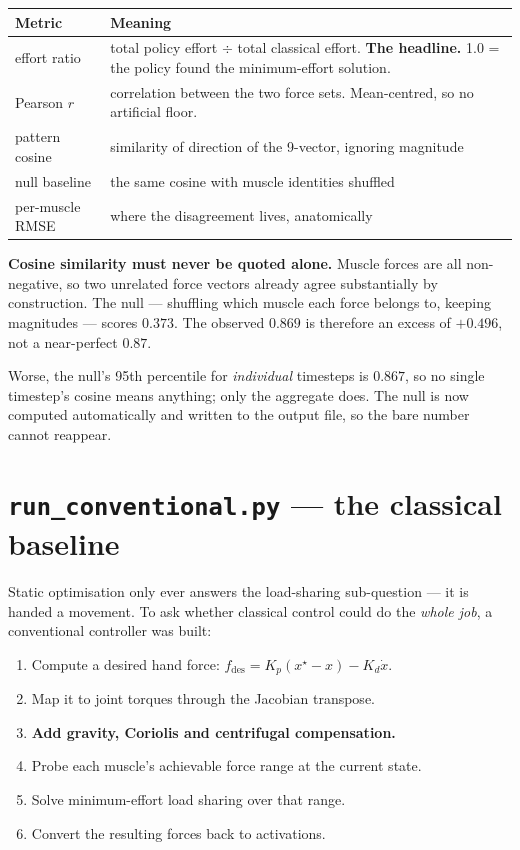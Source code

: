 \begin{center}
\begin{tabular}{@{} L{3.6cm} L{10.4cm} @{}}
\toprule
\textbf{Metric} & \textbf{Meaning} \\
\midrule
effort ratio & total policy effort $\div$ total classical effort. \textbf{The headline.} 1.0 = the policy found the minimum-effort solution. \\
Pearson $r$ & correlation between the two force sets. Mean-centred, so no artificial floor. \\
pattern cosine & similarity of direction of the 9-vector, ignoring magnitude \\
null baseline & the same cosine with muscle identities shuffled \\
per-muscle RMSE & where the disagreement lives, anatomically \\
\bottomrule
\end{tabular}
\end{center}

\begin{trap}
\textbf{Cosine similarity must never be quoted alone.} Muscle forces are all
non-negative, so two unrelated force vectors already agree substantially by
construction. The null --- shuffling which muscle each force belongs to, keeping
magnitudes --- scores $0.373$. The observed $0.869$ is therefore an excess of
$+0.496$, not a near-perfect $0.87$.

Worse, the null's 95th percentile for \emph{individual} timesteps is $0.867$, so
no single timestep's cosine means anything; only the aggregate does. The null is
now computed automatically and written to the output file, so the bare number
cannot reappear.
\end{trap}

\section{\texttt{run\_conventional.py} --- the classical baseline}
\label{sec:conventional}

Static optimisation only ever answers the load-sharing sub-question --- it is
handed a movement. To ask whether classical control could do the \emph{whole
job}, a conventional controller was built:

\begin{enumerate}[leftmargin=1.5em, itemsep=2pt]
\item Compute a desired hand force: $f_{\text{des}} = K_p(x^\star - x) - K_d\dot{x}$.
\item Map it to joint torques through the Jacobian transpose.
\item \textbf{Add gravity, Coriolis and centrifugal compensation.}
\item Probe each muscle's achievable force range at the current state.
\item Solve minimum-effort load sharing over that range.
\item Convert the resulting forces back to activations.
\end{enumerate}

